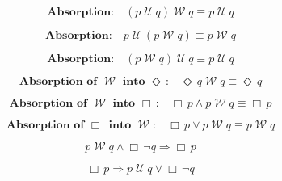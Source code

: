 \documentclass[12pt, fleqn, leqno]{article}
\newcommand{\impl}{\ensuremath{\Rightarrow}}        %
\newcommand{\Until}{\;\mathcal{U}\;}
\newcommand{\Wait}{\;\mathcal{W}\;}
\newcommand{\Event}{\Diamond\,}
\newcommand{\Always}{\Box\,}
\newcommand{\spacer}{\vspace{-30pt}}
\begin{document}
\begin{equation}\label{E:rightWaitAbsUtil}
\textbf{Absorption:}\quad (p \Until q) \Wait q \equiv p \Until q
\end{equation}

\spacer

\begin{equation}\label{E:leftUntilAbsWait}
\textbf{Absorption:}\quad p \Until (p \Wait q) \equiv p \Wait q
\end{equation}

\spacer

\begin{equation}\label{E:rightUntilAbsWait}
\textbf{Absorption:}\quad (p \Wait q) \Until q \equiv p \Until q
\end{equation}

\spacer

\begin{equation}\label{E:absorpEventWait}
\textbf{Absorption of $\Wait$ into $\Event$:}\quad \Event q \Wait q \equiv \Event q
\end{equation}

\spacer

\begin{equation}\label{E:absWaitAlways}
\textbf{Absorption of $\Wait$ into $\Always$:}\quad \Always p\land p\Wait q\equiv \Always p
\end{equation}

\spacer

\begin{equation}\label{E:absAlwaysWait}
\textbf{Absorption of $\Always$ into $\Wait$:}\quad \Always p\lor p\Wait q\equiv p\Wait q
\end{equation}

\spacer

\begin{equation}\label{E:waitEntailAlways}
p \Wait q \land \Always\neg q \impl \Always p
\end{equation}

\spacer

\begin{equation}\label{E:untilEntailAlways}
\Always p\impl p \Until q \lor \Always\neg q 
\end{equation}

\spacer
\end{document}

